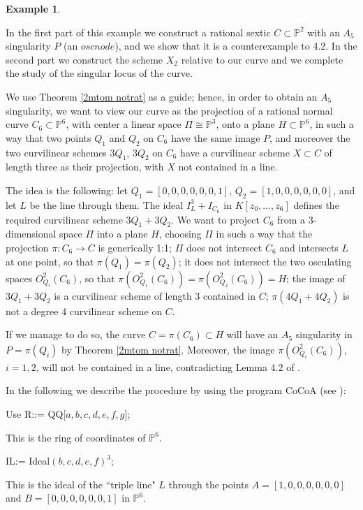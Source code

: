 \documentclass[draft]{amsart}
\theoremstyle{definition}
\theoremstyle{remark}
\theoremstyle{definition}
\newtheorem{ex}[thm]{Example}
\newcommand{\PP}{\mathbb{P}}
\def\a{\bigskip \par \noindent}
\def\dd{\medskip \par \noindent}
\begin{document}
\begin{ex}\label{excocoa}

In the first part of this example we construct a rational sextic   $C\subset \PP^2$  with an $A_5$ singularity  $P$ (an $oscnode$), and we show that it is a counterexample to  \cite{BGI} 4.2. In the second part we construct the scheme $X_2$ relative to our curve and we complete the study of the singular locus of the curve.
\dd {\bf Part I} We use Theorem \ref{2mtom notrat} as a guide; hence, in order to obtain an $A_5$ singularity, we want to view our curve as the projection of a rational normal curve $C_6\subset \PP^6$, with center a linear space $\Pi \cong \PP^3$, onto a plane $H\subset \PP^6$, in such a way that two points $Q_1$ and $Q_2$ on $C_6$  have the same image $P$, and moreover the two curvilinear schemes $3Q_1$, $3Q_2$ on $C_6$ have a curvilinear scheme $X \subset C$ of length three as their projection, with $X$ not contained in a line.
\dd The idea is the following: let $Q_1 = [0,0,0,0,0,0,1]$, $Q_2 = [1,0,0,0,0,0,0]$, and let $L$  be the line through them. The ideal $I_L^3 + I_{C_6}$ in $K[z_0,...,z_6]$ defines the required curvilinear scheme $3Q_1 + 3Q_2$. We want to project $C_6$ from a 3-dimensional space $\Pi$ into a plane $H$, choosing $\Pi$ in such a way that the projection $\pi : C_6 \rightarrow C$ is generically 1:1; $\Pi$ does not intersect $C_6$ and  intersects $L$ at one point, so that $\pi(Q_1)=\pi(Q_2)$; it does not intersect  the two osculating spaces  $O_{Q_i}^2(C_6)$, so that $\pi(O_{Q_1}^2(C_6))=\pi(O_{Q_2}^2(C_6))=H$; the image of $3Q_1+3Q_2$ is a curvilinear scheme of length 3 contained in $C$; $\pi(4Q_1+4Q_2)$ is not a degree 4 curvilinear scheme on $C$.  

\dd If we manage to do so, the curve $C =\pi(C_6)\subset H$  will have an $A_5$ singularity in  $P=\pi(Q_i)$ by Theorem \ref{2mtom notrat}. Moreover, the image $\pi(O_{Q_i}^2(C_6))$, $i=1,2$, will not be contained in a line, contradicting Lemma 4.2 of \cite{BGI}. 

\a In the following we describe the procedure by using the program CoCoA (see \cite{CoCoA}):

\bigskip Use R::= QQ[$a,b,c,d,e,f,g$];

This is the ring of coordinates of $\PP^6$.

\medskip

IL:= Ideal$(b,c,d,e,f)^3$;


\noindent This is the ideal of the ``triple line" $L$ through the points $A=[1,0,0,0,0,0,0]$ and $ B=[0,0,0,0,0,0,1]$  in $\PP^6$.


\end{ex}
\end{document}
